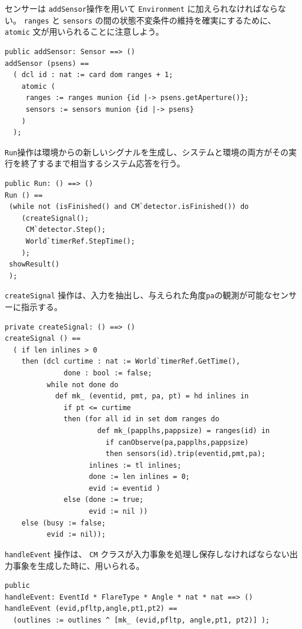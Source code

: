 \documentclass[\pformat,12pt]{jreport}
\begin{document}
センサーは \texttt{addSensor}操作を用いて \texttt{Environment} に加えられなければならない。
\texttt{ranges} と \texttt{sensors} の間の状態不変条件の維持を確実にするために、 \texttt{atomic} 文が用いられることに注意しよう。

\begin{lstlisting}
public addSensor: Sensor ==> ()
addSensor (psens) ==
  ( dcl id : nat := card dom ranges + 1;
    atomic (
     ranges := ranges munion {id |-> psens.getAperture()};
     sensors := sensors munion {id |-> psens} 
    )
  );
\end{lstlisting}

 \texttt{Run}操作は環境からの新しいシグナルを生成し、システムと環境の両方がその実行を終了するまで相当するシステム応答を行う。

\begin{lstlisting}
public Run: () ==> ()
Run () == 
 (while not (isFinished() and CM`detector.isFinished()) do
    (createSignal();
     CM`detector.Step();
     World`timerRef.StepTime();
    );
 showResult()
 );
\end{lstlisting}

\texttt{createSignal}  操作は、入力を抽出し、与えられた角度\texttt{pa}の観測が可能なセンサーに指示する。
\newpage

\begin{lstlisting}
private createSignal: () ==> ()
createSignal () ==
  ( if len inlines > 0
    then (dcl curtime : nat := World`timerRef.GetTime(), 
              done : bool := false;
          while not done do
            def mk_ (eventid, pmt, pa, pt) = hd inlines in
              if pt <= curtime
              then (for all id in set dom ranges do
                      def mk_(papplhs,pappsize) = ranges(id) in
                        if canObserve(pa,papplhs,pappsize)
                        then sensors(id).trip(eventid,pmt,pa);
                    inlines := tl inlines;
                    done := len inlines = 0;
                    evid := eventid )
              else (done := true;
                    evid := nil ))
    else (busy := false;
          evid := nil));
\end{lstlisting}

 \texttt{handleEvent} 操作は、 \texttt{CM} クラスが入力事象を処理し保存しなければならない出力事象を生成した時に、用いられる。

\begin{lstlisting}
public 
handleEvent: EventId * FlareType * Angle * nat * nat ==> ()
handleEvent (evid,pfltp,angle,pt1,pt2) ==
  (outlines := outlines ^ [mk_ (evid,pfltp, angle,pt1, pt2)] );
\end{lstlisting}
\end{document}

